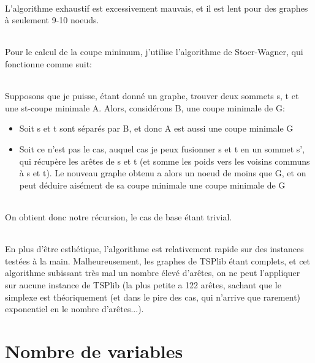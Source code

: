 \documentclass[a4paper]{article}
\begin{document}
\paragraph{}
L'algorithme exhaustif est excessivement mauvais, et  il est lent pour des graphes à seulement 9-10 noeuds.

\paragraph{}
Pour le calcul de la coupe minimum, j'utilise l'algorithme de Stoer-Wagner, qui fonctionne comme suit:

\paragraph{}
Supposons que je puisse, étant donné un graphe, trouver deux sommets s, t et une st-coupe minimale A. Alors, considérons B, une coupe minimale de G:
\begin{itemize}
\item Soit s et t sont séparés par B, et donc A est aussi une coupe minimale G
\item Soit ce n'est pas le cas, auquel cas je peux fusionner s et t en un sommet s', qui récupère les arêtes de s et t (et somme les poids vers les voisins communs à s et t). Le nouveau graphe obtenu a alors un noeud de moins que G, et on peut déduire aisément de sa coupe minimale une coupe minimale de G
\end{itemize}

\paragraph{}
On obtient donc notre récursion, le cas de base étant trivial.

\paragraph{}
En plus d'être esthétique, l'algorithme est relativement rapide sur des instances testées à la main. Malheureusement, les graphes de TSPlib étant complets, et cet algorithme subissant très mal un nombre élevé d'arêtes, on ne peut l'appliquer sur aucune instance de TSPlib (la plus petite a 122 arêtes, sachant que le simplexe est théoriquement (et dans le pire des cas, qui n'arrive que rarement) exponentiel en le nombre d'arêtes...).

\part{Nombre de variables}
\end{document}

